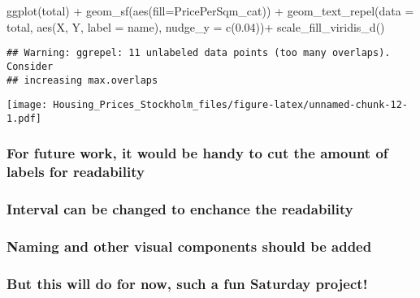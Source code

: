 \documentclass[
]{article}
\newenvironment{Shaded}{\begin{snugshade}}{\end{snugshade}}
\newcommand{\AttributeTok}[1]{\textcolor[rgb]{0.77,0.63,0.00}{#1}}
\newcommand{\FloatTok}[1]{\textcolor[rgb]{0.00,0.00,0.81}{#1}}
\newcommand{\FunctionTok}[1]{\textcolor[rgb]{0.00,0.00,0.00}{#1}}
\newcommand{\NormalTok}[1]{#1}
\newcommand{\SpecialCharTok}[1]{\textcolor[rgb]{0.00,0.00,0.00}{#1}}
\begin{document}
\begin{Shaded}
\begin{Highlighting}[]
\FunctionTok{ggplot}\NormalTok{(total) }\SpecialCharTok{+} 
  \FunctionTok{geom\_sf}\NormalTok{(}\FunctionTok{aes}\NormalTok{(}\AttributeTok{fill=}\NormalTok{PricePerSqm\_cat)) }\SpecialCharTok{+}
  \FunctionTok{geom\_text\_repel}\NormalTok{(}\AttributeTok{data =}\NormalTok{ total, }\FunctionTok{aes}\NormalTok{(X, Y, }\AttributeTok{label =}\NormalTok{ name), }\AttributeTok{nudge\_y =} \FunctionTok{c}\NormalTok{(}\FloatTok{0.04}\NormalTok{))}\SpecialCharTok{+}
  \FunctionTok{scale\_fill\_viridis\_d}\NormalTok{()}
\end{Highlighting}
\end{Shaded}

\begin{verbatim}
## Warning: ggrepel: 11 unlabeled data points (too many overlaps). Consider
## increasing max.overlaps
\end{verbatim}

\texttt{[image: Housing\_Prices\_Stockholm\_files/figure-latex/unnamed-chunk-12-1.pdf]}

\hypertarget{for-future-work-it-would-be-handy-to-cut-the-amount-of-labels-for-readability}{%
\subsubsection{For future work, it would be handy to cut the amount of
labels for
readability}\label{for-future-work-it-would-be-handy-to-cut-the-amount-of-labels-for-readability}}

\hypertarget{interval-can-be-changed-to-enchance-the-readability}{%
\subsubsection{Interval can be changed to enchance the
readability}\label{interval-can-be-changed-to-enchance-the-readability}}

\hypertarget{naming-and-other-visual-components-should-be-added}{%
\subsubsection{Naming and other visual components should be
added}\label{naming-and-other-visual-components-should-be-added}}

\hypertarget{but-this-will-do-for-now-such-a-fun-saturday-project}{%
\subsubsection{But this will do for now, such a fun Saturday
project!}\label{but-this-will-do-for-now-such-a-fun-saturday-project}}
\end{document}
